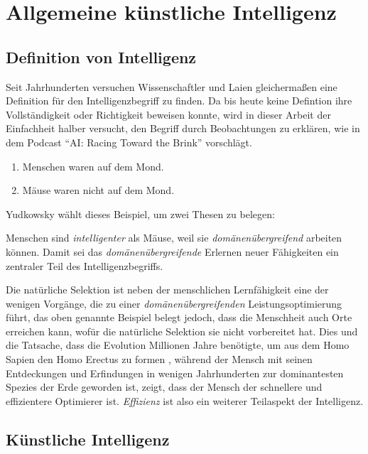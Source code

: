\chapter{Allgemeine künstliche Intelligenz}
\section{Definition von Intelligenz} \label{Intelligenzbegriff}
Seit Jahrhunderten versuchen Wissenschaftler und Laien gleichermaßen eine Definition für den Intelligenzbegriff zu finden. Da bis heute keine Defintion ihre Vollständigkeit oder Richtigkeit beweisen konnte, wird in dieser Arbeit der Einfachheit halber versucht, den Begriff durch Beobachtungen zu erklären, wie \citeauthor{EliezerPodcast} in dem Podcast \enquote{AI: Racing Toward the Brink} vorschlägt. 
\begin{enumerate}
\item Menschen waren auf dem Mond.
\item Mäuse waren nicht auf dem Mond.
\end{enumerate}
Yudkowsky wählt dieses Beispiel, um zwei Thesen zu belegen:

Menschen sind \emph{intelligenter} als Mäuse, weil sie \emph{domänenübergreifend} arbeiten können. Damit sei das \emph{domänenübergreifende} Erlernen neuer Fähigkeiten ein zentraler Teil des Intelligenzbegriffs.


Die natürliche Selektion ist neben der menschlichen Lernfähigkeit eine der wenigen Vorgänge, die zu einer \emph{domänenübergreifenden} Leistungsoptimierung führt, das oben genannte Beispiel belegt jedoch, dass die Menschheit auch Orte erreichen kann, wofür die natürliche Selektion sie nicht vorbereitet hat. Dies und die Tatsache, dass die Evolution Millionen Jahre benötigte, um aus dem Homo Sapien den Homo Erectus zu formen , während der Mensch mit seinen Entdeckungen und Erfindungen in wenigen Jahrhunderten zur dominantesten Spezies der Erde geworden ist, zeigt, dass der Mensch der schnellere und effizientere Optimierer ist. \emph{Effizienz} ist also ein weiterer Teilaspekt der Intelligenz.

\section{Künstliche Intelligenz}

